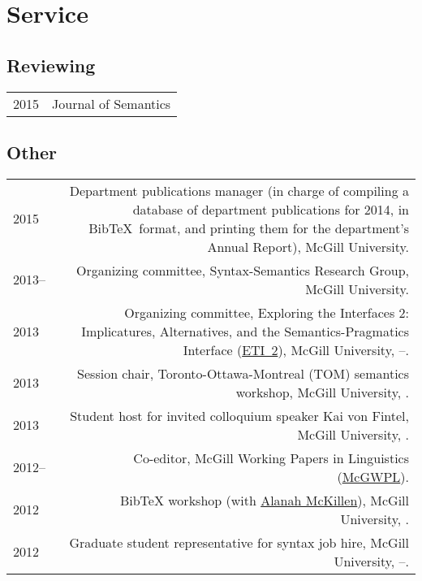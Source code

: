 \documentclass[letterpaper]{article}
\makeatletter
\newcommand{\formatdatenoday}[2]{\mydatenoday\formatdate{0}{#1}{#2}}
\newcommand{\myvrule}{\color{lightgray}\vrule width 1.0pt}
\newenvironment{cvsection}{%
  \renewcommand{\arraystretch}{1.75}
  \begin{longtable}[l]{@{} L R @{}}
}{%
  \end{longtable}
}
\makeatother
\begin{document}
\section*{Service}

\subsection*{Reviewing}

\begin{cvsection}
  2015 & Journal of Semantics
\end{cvsection}

\subsection*{Other}

\begin{cvsection}
  2015 & Department publications manager (in charge of compiling a database of
  department publications for 2014, in Bib\TeX\ format, and printing them for
  the department's Annual Report), McGill University. \\

  2013-- & Organizing committee, Syntax-Semantics Research Group, McGill
  University. \\

  2013 & Organizing committee, Exploring the Interfaces 2: Implicatures,
  Alternatives, and the Semantics-Pragmatics Interface
  (\href{https://sites.google.com/site/eti2pragmatics/}{ETI~2}), McGill
  University, \shortmonthname[4]--\formatdatenoday{6}{2013}. \\

  2013 & Session chair, Toronto-Ottawa-Montreal (TOM) semantics workshop,
  McGill University, . \\

  2013 & Student host for invited colloquium speaker Kai von Fintel, McGill
  University, \formatdatenoday{1}{2013}. \\

  2012-- & Co-editor, McGill Working Papers in Linguistics
  (\href{http://www.mcgill.ca/mcgwpl/}{McGWPL}). \\

  2012 & Bib\TeX{} workshop (with
  \href{http://people.linguistics.mcgill.ca/~alanah.mckillen/}{Alanah
  McKillen}), McGill University, . \\

  2012 & Graduate student representative for syntax job hire, McGill
  University, \shortmonthname[5]--\formatdatenoday{6}{2012}. \\


\end{cvsection}
\end{document}
